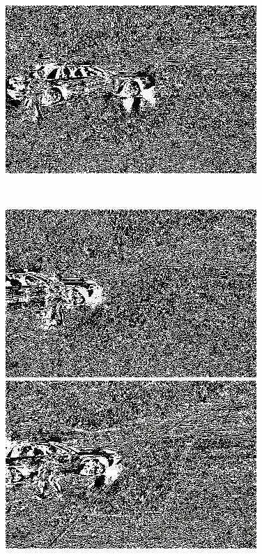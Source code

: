 \documentclass[a4paper]{ctexart}
\begin{document}
\begin{figure}[htbp]
\begin{minipage}[t]{0.2\textwidth}
	\end{minipage}
	\begin{minipage}[t]{0.2\textwidth}
		\centering
		\includegraphics[width=\textwidth]{figure/frames/sb1415.jpg}
	\end{minipage}\\
	\begin{minipage}[t]{0.2\textwidth}
		\centering
		\includegraphics[width=\textwidth]{figure/frames/sb2400.jpg}
	\end{minipage}
	\begin{minipage}[t]{0.2\textwidth}
		\centering
		\includegraphics[width=\textwidth]{figure/frames/sb2405.jpg}

\end{minipage}
\end{figure}
\end{document}
